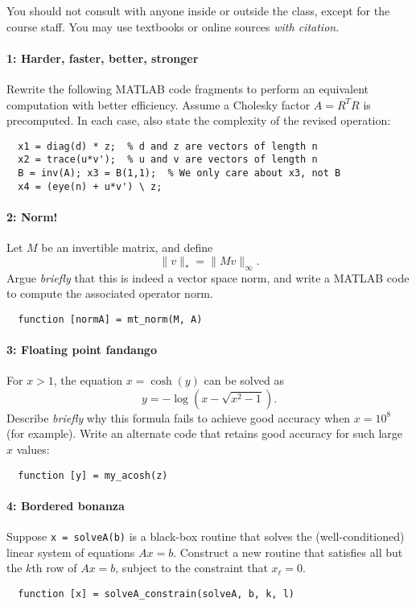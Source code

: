 \documentclass[12pt, leqno]{article}
\begin{document}

You should not consult with anyone inside or outside the class,
except for the course staff.  You may use textbooks or online
sources {\em with citation}.

\paragraph*{1: Harder, faster, better, stronger}
Rewrite the following MATLAB code fragments to perform an
equivalent computation with better efficiency.  Assume a
Cholesky factor $A = R^T R$ is precomputed.  In each case,
also state the complexity of the revised operation:
\begin{lstlisting}
  x1 = diag(d) * z;  % d and z are vectors of length n
  x2 = trace(u*v');  % u and v are vectors of length n
  B = inv(A); x3 = B(1,1);  % We only care about x3, not B
  x4 = (eye(n) + u*v') \ z;
\end{lstlisting}

\paragraph*{2: Norm!}
Let $M$ be an invertible matrix, and define
\[
  \|v\|_* = \|Mv\|_\infty.
\]
Argue {\em briefly} that this is indeed a vector space norm, and
write a MATLAB code to compute the associated operator norm.
\begin{lstlisting}
  function [normA] = mt_norm(M, A)
\end{lstlisting}

\paragraph*{3: Floating point fandango}
For $x > 1$, the equation $x = \cosh(y)$ can be solved as
\[
  y = -\log\left( x-\sqrt{x^2-1} \right).
\]
Describe {\em briefly} why this formula fails to achieve good
accuracy when $x = 10^8$ (for example).  Write an alternate code
that retains good accuracy for such large $x$ values:
\begin{lstlisting}
  function [y] = my_acosh(z)
\end{lstlisting}

\paragraph*{4: Bordered bonanza}
Suppose {\tt x = solveA(b)} is a black-box routine that solves the
(well-conditioned) linear system of equations $Ax = b$.
Construct a new routine that satisfies all but the $k$th row
of $Ax = b$, subject to the constraint that $x_\ell = 0$.
\begin{lstlisting}
  function [x] = solveA_constrain(solveA, b, k, l)
\end{lstlisting}
\end{document}
